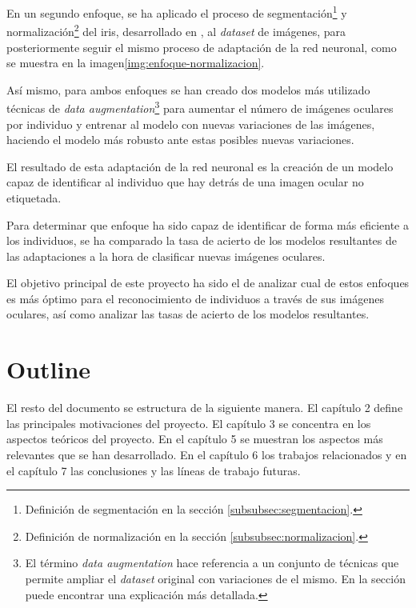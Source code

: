 En un segundo enfoque, se ha aplicado el proceso de segmentación\footnote{Definición de segmentación en la sección \ref{subsubsec:segmentacion}.} y normalización\footnote{Definición de normalización en la sección \ref{subsubsec:normalizacion}.} del iris, desarrollado en \cite{tfg_iris_2020}, al \textit{dataset} de imágenes, para posteriormente seguir el mismo proceso de adaptación de la red neuronal, como se muestra en la imagen\ref{img:enfoque-normalizacion}.



Así mismo, para ambos enfoques se han creado dos modelos más utilizado técnicas de \textit{data augmentation}\footnote{El término \textit{data augmentation} hace referencia a un conjunto de técnicas que permite ampliar el \textit{dataset} original con variaciones de el mismo. En la sección  puede encontrar una explicación más detallada.} para aumentar el número de imágenes oculares por individuo y entrenar al modelo con nuevas variaciones de las imágenes, haciendo el modelo más robusto ante estas posibles nuevas variaciones.

El resultado de esta adaptación de la red neuronal es la creación de un modelo capaz de identificar al individuo que hay detrás de una imagen ocular no etiquetada. 

Para determinar que enfoque ha sido capaz de identificar de forma más eficiente a los individuos, se ha comparado la tasa de acierto de los modelos resultantes de las adaptaciones a la hora de clasificar nuevas imágenes oculares. 

El objetivo principal de este proyecto ha sido el de analizar cual de estos enfoques es más óptimo para el reconocimiento de individuos a través de sus imágenes oculares, así como analizar las tasas de acierto de los modelos resultantes.

\section{Outline}

El resto del documento se estructura de la siguiente manera. El capítulo 2  define las principales motivaciones del proyecto. El capítulo 3  se concentra en los aspectos teóricos del proyecto. En el capítulo 5  se muestran los aspectos
más relevantes que se han desarrollado. En el capítulo 6  los trabajos relacionados y en el capítulo 7  las conclusiones y las líneas de trabajo futuras.
